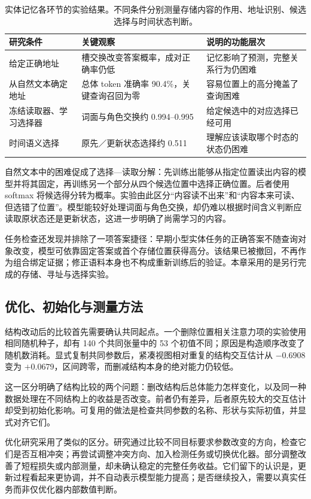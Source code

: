 \begin{table}[htbp]
\caption{实体记忆各环节的实验结果。不同条件分别测量存储内容的作用、地址识别、候选选择与时间状态判断。}
\label{tab:memory_layers}
\small
\begin{tabularx}{\linewidth}{@{}P{35mm}Y Y@{}}
\toprule 研究条件 & 关键观察 & 说明的功能层次\\\midrule
给定正确地址 & 槽交换改变答案概率，成对正确率仍低 & 记忆影响了预测，完整关系行为仍困难\\
从自然文本确定地址 & 总体 token 准确率 90.4\%，关键查询召回为零 & 容易位置上的高分掩盖了查询困难\\
冻结读取器、学习选择器 & 词面与角色交换约 0.994--0.995 & 给定候选中的对应选择已经可用\\
时间语义选择 & 原先／更新状态选择约 0.511 & 理解应该读取哪个时态的状态仍困难\\
\bottomrule
\end{tabularx}
\end{table}

自然文本中的困难促成了选择—读取分解：先训练出能够从指定位置读出内容的模型并将其固定，再训练另一个部分从四个候选位置中选择正确位置。后者使用 softmax 将候选得分转为概率。实验由此区分“内容读不出来”和“内容本来可读、但选错了位置”。模型能较好处理词面与角色交换，却仍难以根据时间含义判断应读取原状态还是更新状态，这进一步明确了尚需学习的内容。

任务检查还发现并排除了一项答案捷径：早期小型实体任务的正确答案不随查询对象改变，模型可依靠固定答案或首个存储位置获得高分。该结果已被撤回，不再作为组合绑定证据；修正语料本身也不构成重新训练后的验证。本章采用的是另行完成的存储、寻址与选择实验。

\subsection{优化、初始化与测量方法}
\label{sec:measurement_branch}

结构改动后的比较首先需要确认共同起点。一个删除位置相关注意力项的实验使用相同随机种子，却有 140 个共同张量中的 53 个初值不同；原因是构造顺序改变了随机数消耗。显式复制共同参数后，紧凑视图相对重复的结构交互估计从 $-0.6908$ 变为 $+0.0679$，区间跨零，而删减结构本身的绝对能力仍较低。

这一区分明确了结构比较的两个问题：删改结构后总体能力怎样变化，以及同一种数据处理在不同结构上的收益是否改变。前者仍有差异，后者原先较大的交互估计却受到初始化影响。可复用的做法是检查共同参数的名称、形状与实际初值，并显式对齐它们。

优化研究采用了类似的区分。研究通过比较不同目标要求参数改变的方向，检查它们是否互相冲突；再尝试调整冲突方向、加入检测任务或切换优化器。部分调整改善了短程损失或内部测量，却未确认稳定的完整任务收益。它们留下的认识是，更新过程看起来更协调，并不自动表示模型能力提高；是否继续投入，需要以真实任务而非仅优化器内部数值判断。

